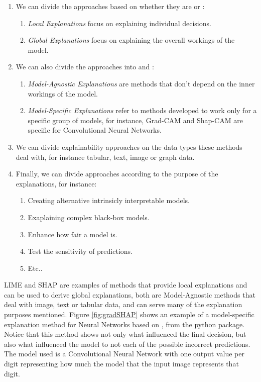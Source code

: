\begin{enumerate}
\item We can divide the approaches based on whether they are  or : \begin{enumerate}
    \item \emph{Local Explanations} focus on explaining individual decisions.
    \item \emph{Global Explanations} focus on explaining the overall workings of the model.
    \end{enumerate}
\item We can also divide the approaches into  and : \begin{enumerate}
    \item \emph{Model-Agnostic Explanations} are methods that don't depend on the inner workings of the model.
    \item \emph{Model-Specific Explanations} refer to methods developed to work only for a specific group of models, for instance, Grad-CAM and Shap-CAM are specific for Convolutional Neural Networks.
    \end{enumerate}
\item We can divide explainability approaches on the data types these methods deal with, for instance tabular, text, image or graph data.
\item Finally, we can divide approaches according to the purpose of the explanations, for instance: \begin{enumerate}
    \item Creating alternative intrinsicly interpretable models.
    \item Exaplaining complex black-box models.
    \item Enhance how fair a model is.
    \item Test the sensitivity of predictions.
    \item Etc..
    \end{enumerate}
\end{enumerate}

LIME \cite{ribeiro2016should} and SHAP \cite{lundberg2017unified} are examples of methods that provide local explanations and can be used to derive global explanations, both are Model-Agnostic methods that deal with image, text or tabular data, and can serve many of the explanation purposes mentioned. Figure \ref{fig:gradSHAP} shows an example of a model-specific explanation method for Neural Networks based on , from the  python package. Notice that this method shows not only what influenced the final decision, but also what influenced the model to not  each of the possible incorrect predictions. The model used is a Convolutional Neural Network with one output value per digit representing how much the model  that the input image represents that digit.

